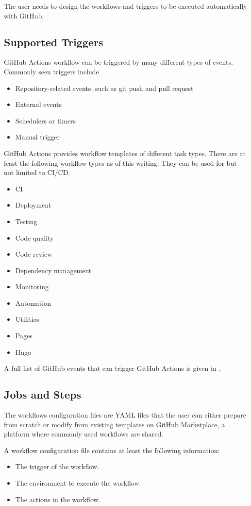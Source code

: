 The user needs to design the workflows and triggers to be executed automatically with GitHub.

\subsection{Supported Triggers}

GitHub Actions workflow can be triggered by many different types of events. Commonly seen triggers include
\begin{itemize}
	\item Repository-related events, such as git push and pull request
	\item External events
	\item Schedulers or timers
	\item Manual trigger
\end{itemize}

GitHub Actions provides workflow templates of different task types. There are at least the following workflow types as of this writing. They can be used for but not limited to CI/CD.
\begin{itemize}
	\item CI
	\item Deployment
	\item Testing
	\item Code quality
	\item Code review
	\item Dependency management
	\item Monitoring
	\item Automation
	\item Utilities
	\item Pages
	\item Hugo
\end{itemize}

A full list of GitHub events that can trigger GitHub Actions is given in \cite{git2025reference}.

\subsection{Jobs and Steps}

The workflows configuration files are YAML files that the user can either prepare from scratch or modify from existing templates on GitHub Marketplace, a platform where commonly used workflows are shared.

A workflow configuration file contains at least the following information:
\begin{itemize}
	\item The trigger of the workflow.
	\item The environment to execute the workflow.
	\item The actions in the workflow.
\end{itemize}


